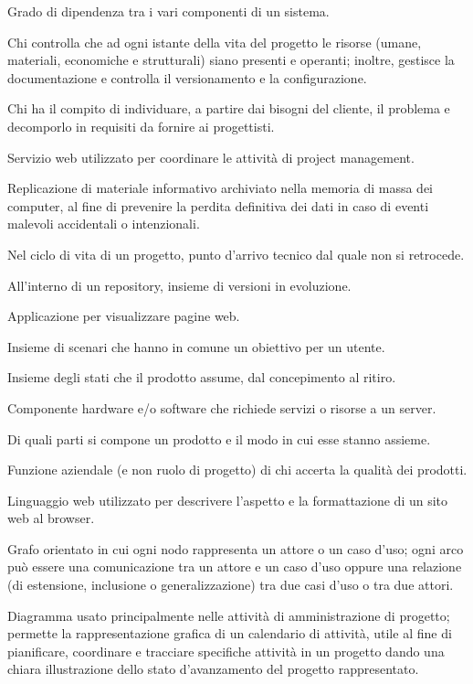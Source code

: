\item[accoppiamento] Grado di dipendenza tra i vari componenti di un sistema.
\item[amministratore di progetto] Chi controlla che ad ogni istante della vita del progetto le risorse (umane, materiali, economiche e strutturali) siano presenti e operanti; inoltre, gestisce la documentazione e controlla il versionamento e la configurazione.
\item[analista] Chi ha il compito di individuare, a partire dai bisogni del cliente, il problema e decomporlo in requisiti da fornire ai progettisti.
\item[Asana] Servizio web utilizzato per coordinare le attività di project management.

\item[backup] Replicazione di materiale informativo archiviato nella memoria di massa dei computer, al fine di prevenire la perdita definitiva dei dati in caso di eventi malevoli accidentali o intenzionali.
\item[baseline] Nel ciclo di vita di un progetto, punto d'arrivo tecnico dal quale non si retrocede.
\item[branch] All'interno di un repository, insieme di versioni in evoluzione.
\item[browser] Applicazione per visualizzare pagine web.
\item[caso d'uso] Insieme di scenari che hanno in comune un obiettivo per un utente.
\item[ciclo di vita (di un prodotto)] Insieme degli stati che il prodotto assume, dal concepimento al ritiro.
\item[client] Componente hardware e/o software che richiede servizi o risorse a un server.
\item[configurazione] Di quali parti si compone un prodotto e il modo in cui esse stanno assieme.
\item[controllore della qualità] Funzione aziendale (e non ruolo di progetto) di chi accerta la qualità dei prodotti.
\item[CSS3] Linguaggio web utilizzato per descrivere l'aspetto e la formattazione di un sito web al browser.
\item[diagramma dei casi d'uso] Grafo orientato in cui ogni nodo rappresenta un attore o un caso d'uso; ogni arco può essere una comunicazione tra un attore e un caso d'uso oppure una relazione (di estensione, inclusione o generalizzazione) tra due casi d'uso o tra due attori.
\item[Diagramma di Gantt] Diagramma usato principalmente nelle attività di amministrazione di progetto; permette la rappresentazione grafica di un calendario di attività, utile al fine di pianificare, coordinare e tracciare specifiche attività in un progetto dando una chiara illustrazione dello stato d’avanzamento del progetto rappresentato.
